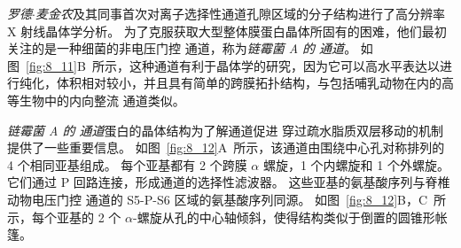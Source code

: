 \textit{罗德$\cdot$麦金农}及其同事首次对离子选择性通道孔隙区域的分子结构进行了高分辨率 X 射线晶体学分析。
为了克服获取大型整体膜蛋白晶体所固有的困难，他们最初关注的是一种细菌的非电压门控  通道，称为\textit{链霉菌 A 的  通道}。
如图~\ref{fig:8_11}B~所示，这种通道有利于晶体学的研究，因为它可以高水平表达以进行纯化，体积相对较小，并且具有简单的跨膜拓扑结构，与包括哺乳动物在内的高等生物中的内向整流 通道类似。


\textit{链霉菌 A 的  通道}蛋白的晶体结构为了解通道促进  穿过疏水脂质双层移动的机制提供了一些重要信息。
如图~\ref{fig:8_12}A~所示，该通道由围绕中心孔对称排列的 4 个相同亚基组成。
每个亚基都有 2 个跨膜 $\alpha$ 螺旋，1 个内螺旋和 1 个外螺旋。
它们通过 P 回路连接，形成通道的选择性滤波器。
这些亚基的氨基酸序列与脊椎动物电压门控  通道的 S5-P-S6 区域的氨基酸序列同源。
如图~\ref{fig:8_12}B，C~所示，每个亚基的 2 个 $\alpha$-螺旋从孔的中心轴倾斜，使得结构类似于倒置的圆锥形帐篷。


